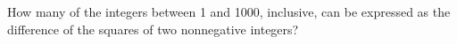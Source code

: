 How many of the integers between 1 and 1000, inclusive, can be expressed as the difference of the squares of two nonnegative integers?